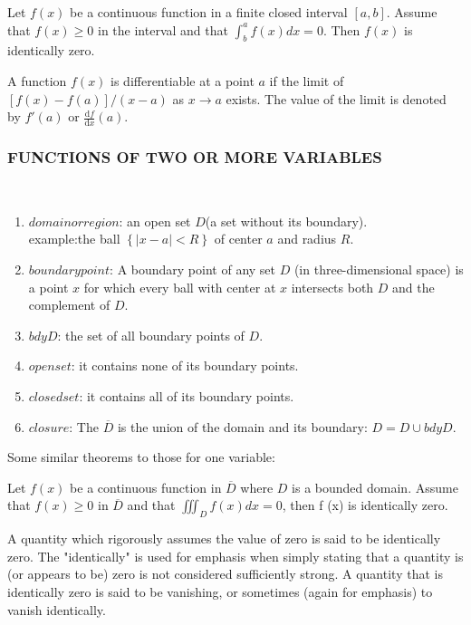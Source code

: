 \documentclass[hazy,blue,11pt]{elegantnote}
\begin{document}
\begin{theorem}
    Let $f(x)$ be a continuous function in a finite closed interval $[a,b]$. Assume that $f(x) \ge 0$ in the interval and that $\int_{b}^{a} f(x)dx=0$. Then $f(x)$ is identically zero.
\end{theorem}

\begin{definition}[differentiable]
    A function $f(x)$ is differentiable at a point $a$ if the limit of $[f(x)-f(a)]/(x-a)$ as $x \to a$ exists. The value of the limit is denoted by ${f}'(a)$ or $\frac{\mathrm{d} f}{\mathrm{d} x}(a)$.
\end{definition}

\subsubsection{FUNCTIONS OF TWO OR MORE VARIABLES}
\begin{definition}
~\\
    \begin{enumerate}
        \item $domain or region$: an open set $D$(a set without its boundary).\\
                example:the ball $\left \{  \left | x-a \right |<R \right \}$ of center $a$ and radius $R$.
        \item $boundary point$: A boundary point of any set $D$ (in three-dimensional space) is a point $x$ for which every ball with center at $x$ intersects both $D$ and the complement of $D$.
        \item $bdy D$: the set of all boundary points of $D$.
        \item $open set$: it contains none of its boundary points.
        \item $closed set$: it contains all of its boundary points.
        \item $closure$: The $\overline{D}$ is the union of the domain and its boundary: $D=D \cup bdy D$.
    \end{enumerate}
\end{definition}

Some similar theorems to those for one variable:
\begin{theorem}
    Let $f(x)$ be a continuous function in $\overline{D}$ where $D$ is a bounded domain. Assume that $f(x) \ge 0$ in $\overline{D}$ and that $\iiint_{D}f(x)dx=0$, then f (x) is identically zero.
    \begin{note}
        A quantity which rigorously assumes the value of zero is said to be identically zero. The "identically" is used for emphasis when simply stating that a quantity is (or appears to be) zero is not considered sufficiently strong. A quantity that is identically zero is said to be vanishing, or sometimes (again for emphasis) to vanish identically.
    \end{note}
\end{theorem}
\end{document}
